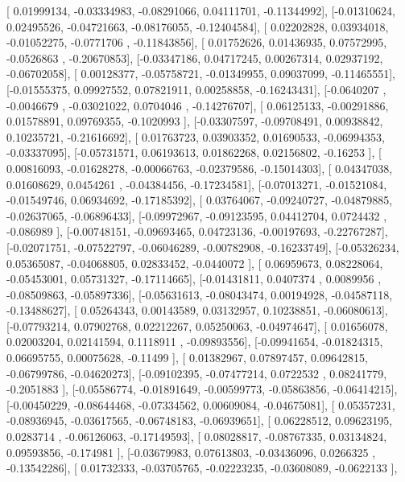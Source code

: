\documentclass{article}
\begin{document}
       [ 0.01999134, -0.03334983, -0.08291066,  0.04111701, -0.11344992],
       [-0.01310624,  0.02495526, -0.04721663, -0.08176055, -0.12404584],
       [ 0.02202828,  0.03934018, -0.01052275, -0.0771706 , -0.11843856],
       [ 0.01752626,  0.01436935,  0.07572995, -0.0526863 , -0.20670853],
       [-0.03347186,  0.04717245,  0.00267314,  0.02937192, -0.06702058],
       [ 0.00128377, -0.05758721, -0.01349955,  0.09037099, -0.11465551],
       [-0.01555375,  0.09927552,  0.07821911,  0.00258858, -0.16243431],
       [-0.0640207 , -0.0046679 , -0.03021022,  0.0704046 , -0.14276707],
       [ 0.06125133, -0.00291886,  0.01578891,  0.09769355, -0.1020993 ],
       [-0.03307597, -0.09708491,  0.00938842,  0.10235721, -0.21616692],
       [ 0.01763723,  0.03903352,  0.01690533, -0.06994353, -0.03337095],
       [-0.05731571,  0.06193613,  0.01862268,  0.02156802, -0.16253   ],
       [ 0.00816093, -0.01628278, -0.00066763, -0.02379586, -0.15014303],
       [ 0.04347038,  0.01608629,  0.0454261 , -0.04384456, -0.17234581],
       [-0.07013271, -0.01521084, -0.01549746,  0.06934692, -0.17185392],
       [ 0.03764067, -0.09240727, -0.04879885, -0.02637065, -0.06896433],
       [-0.09972967, -0.09123595,  0.04412704,  0.0724432 , -0.086989  ],
       [-0.00748151, -0.09693465,  0.04723136, -0.00197693, -0.22767287],
       [-0.02071751, -0.07522797, -0.06046289, -0.00782908, -0.16233749],
       [-0.05326234,  0.05365087, -0.04068805,  0.02833452, -0.0440072 ],
       [ 0.06959673,  0.08228064, -0.05453001,  0.05731327, -0.17114665],
       [-0.01431811,  0.0407374 ,  0.0089956 , -0.08509863, -0.05897336],
       [-0.05631613, -0.08043474,  0.00194928, -0.04587118, -0.13488627],
       [ 0.05264343,  0.00143589,  0.03132957,  0.10238851, -0.06080613],
       [-0.07793214,  0.07902768,  0.02212267,  0.05250063, -0.04974647],
       [ 0.01656078,  0.02003204,  0.02141594,  0.1118911 , -0.09893556],
       [-0.09941654, -0.01824315,  0.06695755,  0.00075628, -0.11499   ],
       [ 0.01382967,  0.07897457,  0.09642815, -0.06799786, -0.04620273],
       [-0.09102395, -0.07477214,  0.0722532 ,  0.08241779, -0.2051883 ],
       [-0.05586774, -0.01891649, -0.00599773, -0.05863856, -0.06414215],
       [-0.00450229, -0.08644468, -0.07334562,  0.00609084, -0.04675081],
       [ 0.05357231, -0.08936945, -0.03617565, -0.06748183, -0.06939651],
       [ 0.06228512,  0.09623195,  0.0283714 , -0.06126063, -0.17149593],
       [ 0.08028817, -0.08767335,  0.03134824,  0.09593856, -0.174981  ],
       [-0.03679983,  0.07613803, -0.03436096,  0.0266325 , -0.13542286],
       [ 0.01732333, -0.03705765, -0.02223235, -0.03608089, -0.0622133 ],
\end{document}
